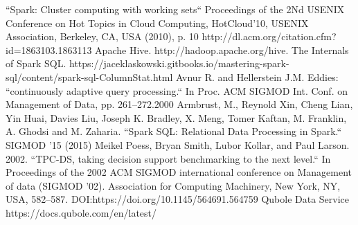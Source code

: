 \documentclass[conference]{IEEEtran}
\begin{document}
\begin{thebibliography}{00}
``Spark: Cluster computing with working sets`` Proceedings of the 2Nd USENIX Conference on Hot Topics in Cloud Computing, HotCloud’10, USENIX Association, Berkeley, CA, USA (2010), p. 10 http://dl.acm.org/citation.cfm?id=1863103.1863113
 Apache Hive. http://hadoop.apache.org/hive.
 The Internals of Spark SQL. https://jaceklaskowski.gitbooks.io/mastering-spark-sql/content/spark-sql-ColumnStat.html
 Avnur R. and Hellerstein J.M. Eddies: ``continuously adaptive query processing.`` In Proc. ACM SIGMOD Int. Conf. on Management of Data, pp. 261–272.2000
 Armbrust, M., Reynold Xin, Cheng Lian, Yin Huai, Davies Liu, Joseph K. Bradley, X. Meng, Tomer Kaftan, M. Franklin, A. Ghodsi and M. Zaharia. ``Spark SQL: Relational Data Processing in Spark.`` SIGMOD '15 (2015)
 Meikel Poess, Bryan Smith, Lubor Kollar, and Paul Larson. 2002. ``TPC-DS, taking decision support benchmarking to the next level.``  In Proceedings of the 2002 ACM SIGMOD international conference on Management of data (SIGMOD '02). Association for Computing Machinery, New York, NY, USA, 582–587. DOI:https://doi.org/10.1145/564691.564759
 Qubole Data Service https://docs.qubole.com/en/latest/
\end{thebibliography}
\end{document}
